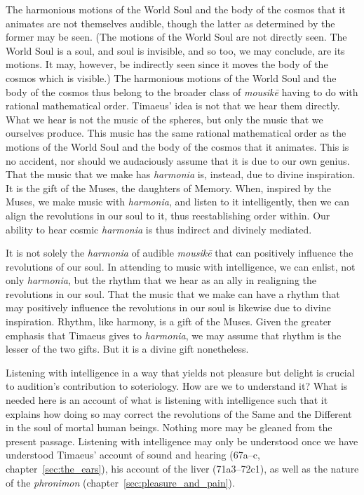 The harmonious motions of the World Soul and the body of the cosmos that it animates are not themselves audible, though the latter as determined by the former may be seen. (The motions of the World Soul are not directly seen. The World Soul is a soul, and soul is invisible, and so too, we may conclude, are its motions. It may, however, be indirectly seen since it moves the body of the cosmos which is visible.) The harmonious motions of the World Soul and the body of the cosmos thus belong to the broader class of \emph{mousikē} having to do with rational mathematical order. Timaeus' idea is not that we hear them directly. What we hear is not the music of the spheres, but only the music that we ourselves produce. This music has the same rational mathematical order as the motions of the World Soul and the body of the cosmos that it animates. This is no accident, nor should we audaciously assume that it is due to our own genius. That the music that we make has \emph{harmonia} is, instead, due to divine inspiration. It is the gift of the Muses, the daughters of Memory. When, inspired by the Muses, we make music with \emph{harmonia}, and listen to it intelligently, then we can align the revolutions in our soul to it, thus reestablishing order within. Our ability to hear cosmic \emph{harmonia} is thus indirect and divinely mediated.

It is not solely the \emph{harmonia} of audible \emph{mousikē} that can positively influence the revolutions of our soul. In attending to music with intelligence, we can enlist, not only \emph{harmonia}, but the rhythm that we hear as an ally in realigning the revolutions in our soul. That the music that we make can have a rhythm that may positively influence the revolutions in our soul is likewise due to divine inspiration. Rhythm, like harmony, is a gift of the Muses. Given the greater emphasis that Timaeus gives to \emph{harmonia}, we may assume that rhythm is the lesser of the two gifts. But it is a divine gift nonetheless.

Listening with intelligence in a way that yields not pleasure but delight is crucial to audition's contribution to soteriology. How are we to understand it? What is needed here is an account of what is listening with intelligence such that it explains how doing so may correct the revolutions of the Same and the Different in the soul of mortal human beings. Nothing more may be gleaned from the present passage. Listening with intelligence may only be understood once we have understood Timaeus' account of sound and hearing (67a–c, chapter~\ref{sec:the_ears}), his account of the liver (71a3–72c1), as well as the nature of the \emph{phronimon} (chapter~\ref{sec:pleasure_and_pain}).

